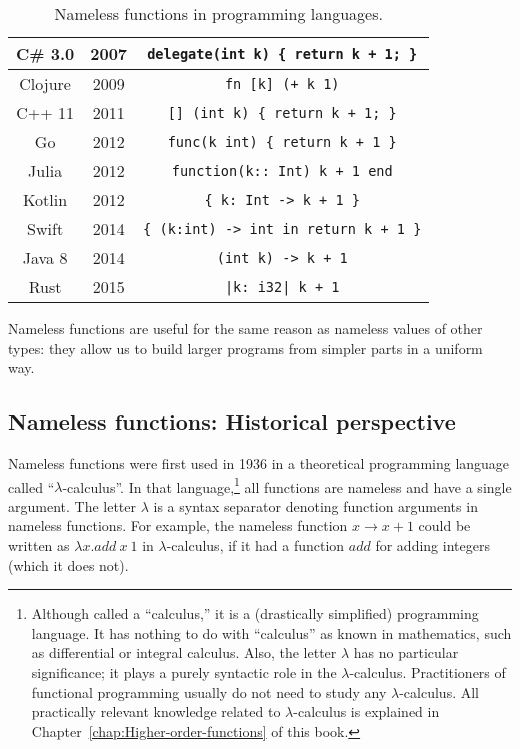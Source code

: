 \begin{wraptable}{r}{0.6\columnwidth}
\begin{centering}
\begin{tabular}{|c|c|c|}
\hline 
{\footnotesize{}C\# 3.0} & {\footnotesize{}2007} & \lstinline!delegate(int k) { return k + 1; }!\tabularnewline
\hline 
{\footnotesize{}Clojure} & {\footnotesize{}2009} & \lstinline!fn [k] (+ k 1)!\tabularnewline
\hline 
{\footnotesize{}C++ 11} & {\footnotesize{}2011} & \lstinline![] (int k) { return k + 1; }!\tabularnewline
\hline 
{\footnotesize{}Go} & {\footnotesize{}2012} & \lstinline!func(k int) { return k + 1 }!\tabularnewline
\hline 
{\footnotesize{}Julia} & {\footnotesize{}2012} & \lstinline!function(k:: Int) k + 1 end!\tabularnewline
\hline 
{\footnotesize{}Kotlin} & {\footnotesize{}2012} & \lstinline!{ k: Int -> k + 1 }!\tabularnewline
\hline 
{\footnotesize{}Swift} & {\footnotesize{}2014} & \lstinline!{ (k:int) -> int in return k + 1 }!\tabularnewline
\hline 
{\footnotesize{}Java 8} & {\footnotesize{}2014} & \lstinline!(int k) -> k + 1!\tabularnewline
\hline 
{\footnotesize{}Rust} & {\footnotesize{}2015} & \lstinline!|k: i32| k + 1!\tabularnewline
\hline 
\end{tabular}
\par\end{centering}
\caption{Nameless functions in programming languages.\label{lambda-functions-table}}
\vspace{-3\baselineskip}
\end{wraptable}%

\noindent Nameless functions are useful for the same reason as nameless
values of other types: they allow us to build larger programs from
simpler parts in a uniform way.

\subsection{Nameless functions: Historical perspective}

Nameless functions were first used in 1936 in a theoretical programming
language called \textsf{``}$\lambda$-calculus\textsf{''}.
In that language,\footnote{Although called a \textsf{``}calculus,\textsf{''} it is a (drastically simplified)
programming language. It has nothing to do with \textsf{``}calculus\textsf{''} as
known in mathematics, such as differential or integral calculus. Also,
the letter $\lambda$ has no particular significance; it plays a purely
syntactic role in the $\lambda$-calculus. Practitioners of functional
programming usually do not need to study any $\lambda$-calculus.
All practically relevant knowledge related to $\lambda$-calculus
is explained in Chapter~\ref{chap:Higher-order-functions} of this
book.} all functions are nameless and have a single argument. The letter
$\lambda$ is a syntax separator denoting function arguments in nameless
functions. For example, the nameless function $x\rightarrow x+1$
could be written as $\lambda x.add~x~1$ in $\lambda$-calculus, if
it had a function $add$ for adding integers (which it does not).

